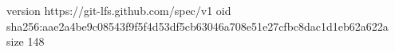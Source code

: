 version https://git-lfs.github.com/spec/v1
oid sha256:aae2a4be9c08543f9f5f4d53df5cb63046a708e51e27cfbc8dac1d1eb62a622a
size 148
